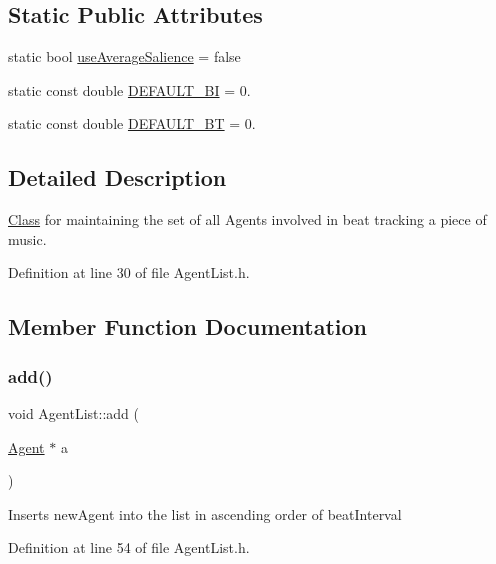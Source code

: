 \subsection*{Static Public Attributes}
\begin{DoxyCompactItemize}
\item 
static bool \hyperlink{class_agent_list_a0c56c3377c849c460e5a74c835d4f635}{use\+Average\+Salience} = false
\item 
static const double \hyperlink{class_agent_list_a8da51527cedc40ee03bec9d9b4db0a2d}{D\+E\+F\+A\+U\+L\+T\+\_\+\+BI} = 0.
\item 
static const double \hyperlink{class_agent_list_aa06e5fc242ea1f390252c4e2a03ce163}{D\+E\+F\+A\+U\+L\+T\+\_\+\+BT} = 0.
\end{DoxyCompactItemize}


\subsection{Detailed Description}
\hyperlink{struct_class}{Class} for maintaining the set of all Agents involved in beat tracking a piece of music. 

Definition at line 30 of file Agent\+List.\+h.



\subsection{Member Function Documentation}
\mbox{\label{class_agent_list_ab87ca56331120c2dd7174464879acad7}} 
\subsubsection{\texorpdfstring{add()}{add()}\hspace{0.1cm}{\footnotesize\ttfamily [1/2]}}
{\footnotesize\ttfamily void Agent\+List\+::add (\begin{DoxyParamCaption}\item[{\hyperlink{class_agent}{Agent} $\ast$}]{a }\end{DoxyParamCaption})\hspace{0.3cm}{\ttfamily [inline]}}

Inserts new\+Agent into the list in ascending order of beat\+Interval 

Definition at line 54 of file Agent\+List.\+h.

